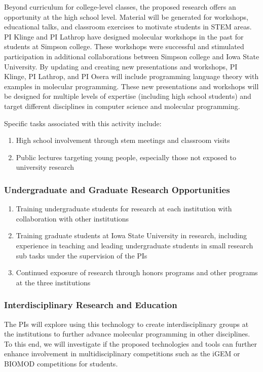 Beyond curriculum for college-level classes, the proposed research offers an opportunity at the high school level.
Material will be generated for workshops, educational talks, and classroom exercises to  motivate students in STEM areas.  PI Klinge and PI Lathrop have designed molecular workshops in the past for students at Simpson college.
These workshops were successful and stimulated participation in additional collaborations between Simpson college and Iowa State University.
By updating and creating new presentations and workshops, PI Klinge, PI Lathrop, and PI Osera will include programming language theory with examples in molecular programming.
These new presentations and workshops will be designed for multiple levels of expertise (including high school students) and target different disciplines in computer science and molecular programming.

Specific tasks associated with this activity include:
\begin{enumerate}
	\item High school involvement through stem meetings and classroom visits
	\item Public lectures targeting young people, especially those not exposed to university research
\end{enumerate}

\subsubsection*{Undergraduate and Graduate Research Opportunities}

\begin{enumerate}
	\item Training undergraduate students for research at each institution with collaboration with other institutions
	\item Training graduate students at Iowa State University in research, including experience in teaching and leading undergraduate students in small research sub tasks under the supervision of the PIs
	\item Continued exposure of research through honors programs and other programs at the three institutions
\end{enumerate}

\subsubsection*{Interdisciplinary Research and Education}
The PIs will explore using this technology to create interdisciplinary groups at the institutions to further advance molecular programming in other disciplines.  To this end, we will investigate if the proposed technologies and tools can further enhance involvement in multidisciplinary competitions such as the iGEM or BIOMOD competitions for students.

